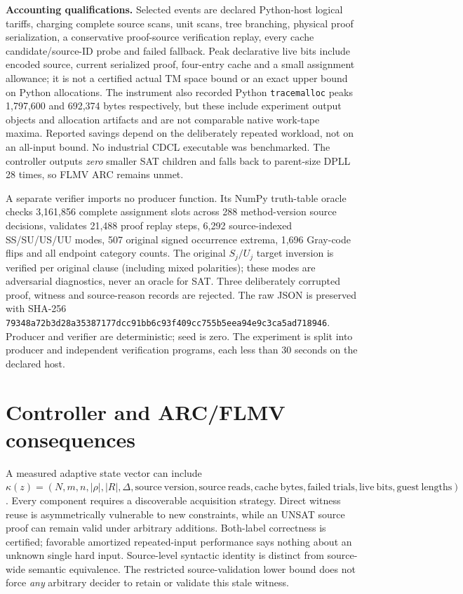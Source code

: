 \documentclass[11pt]{article}
\begin{document}
\noindent \textbf{Accounting qualifications.} Selected events are declared Python-host logical tariffs, charging complete source scans, unit scans, tree branching, physical proof serialization, a conservative proof-source verification replay, every cache candidate/source-ID probe and failed fallback. Peak declarative live bits include encoded source, current serialized proof, four-entry cache and a small assignment allowance; it is not a certified actual TM space bound or an exact upper bound on Python allocations. The instrument also recorded Python \texttt{tracemalloc} peaks 1,797,600 and 692,374 bytes respectively, but these include experiment output objects and allocation artifacts and are not comparable native work-tape maxima. Reported savings depend on the deliberately repeated workload, not on an all-input bound. No industrial CDCL executable was benchmarked. The controller outputs \emph{zero} smaller SAT children and falls back to parent-size DPLL 28 times, so FLMV ARC remains unmet.

A separate verifier imports no producer function. Its NumPy truth-table oracle checks 3,161,856 complete assignment slots across 288 method-version source decisions, validates 21,488 proof replay steps, 6,292 source-indexed SS/SU/US/UU modes, 507 original signed occurrence extrema, 1,696 Gray-code flips and all endpoint category counts. The original $S_j/U_j$ target inversion is verified per original clause (including mixed polarities); these modes are adversarial diagnostics, never an oracle for SAT. Three deliberately corrupted proof, witness and source-reason records are rejected. The raw JSON is preserved with SHA-256 \texttt{79348a72b3d28a35387177dcc91bb6c93f409cc755b5eea94e9c3ca5ad718946}. Producer and verifier are deterministic; seed is zero. The experiment is split into producer and independent verification programs, each less than 30 seconds on the declared host.

\section{Controller and ARC/FLMV consequences}
A measured adaptive state vector can include $\kappa(z)=(N,m,n,|\rho|,|R|,\Delta,\mathrm{source\ version},\mathrm{source\ reads},\mathrm{cache\ bytes},\mathrm{failed\ trials},\mathrm{live\ bits},\mathrm{guest\ lengths})$. Every component requires a discoverable acquisition strategy. Direct witness reuse is asymmetrically vulnerable to new constraints, while an UNSAT source proof can remain valid under arbitrary additions. Both-label correctness is certified; favorable amortized repeated-input performance says nothing about an unknown single hard input. Source-level syntactic identity is distinct from source-wide semantic equivalence. The restricted source-validation lower bound does not force \emph{any} arbitrary decider to retain or validate this stale witness.
\end{document}
